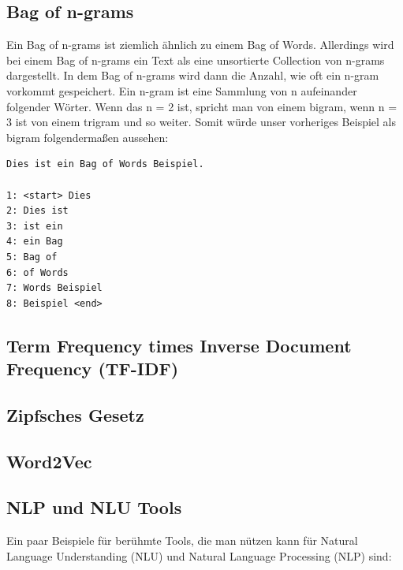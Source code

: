 \subsection{Bag of n-grams}

Ein Bag of n-grams ist ziemlich ähnlich zu einem Bag of Words.
Allerdings wird bei einem Bag of n-grams ein Text als eine unsortierte Collection von n-grams dargestellt.
In dem Bag of n-grams wird dann die Anzahl, wie oft ein n-gram vorkommt gespeichert.
Ein n-gram ist eine Sammlung von n aufeinander folgender Wörter.
Wenn das n = 2 ist, spricht man von einem bigram, wenn n = 3 ist von einem trigram und so weiter.
Somit würde unser vorheriges Beispiel als bigram folgendermaßen aussehen:

\begin{lstlisting}[label={lst: Bag of n-grams Beispiel}]
Dies ist ein Bag of Words Beispiel.

1: <start> Dies
2: Dies ist
3: ist ein
4: ein Bag
5: Bag of
6: of Words
7: Words Beispiel
8: Beispiel <end>
\end{lstlisting}

\subsection{Term Frequency times Inverse Document Frequency (TF-IDF)}


\subsection{Zipfsches Gesetz}


\subsection{Word2Vec}


\subsection{NLP und NLU Tools}

Ein paar Beispiele für berühmte Tools, die man nützen kann für Natural Language Understanding (NLU) und Natural Language Processing (NLP) sind:

